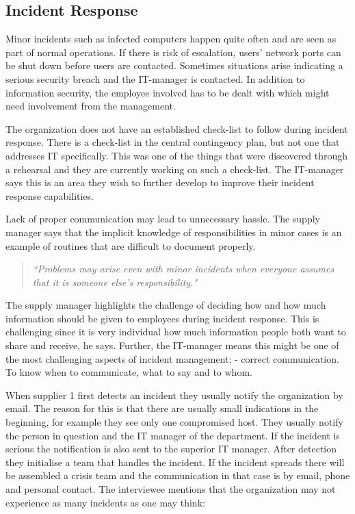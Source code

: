 \subsection{Incident Response}
Minor incidents such as infected computers happen quite often and are seen as part of normal operations. If there is risk of escalation, users' network ports can be shut down before users are contacted. Sometimes situations arise indicating a serious security breach and the IT-manager is contacted. In addition to information security, the employee involved has to be dealt with which might need involvement from the management.

The organization does not have an established check-list to follow during incident response. There is a check-list in the central contingency plan, but not one that addresses IT specifically. This was one of the things that were discovered through a rehearsal and they are currently working on such a check-list. The IT-manager says this is an area they wish to further develop to improve their incident response capabilities. 

Lack of proper communication may lead to unnecessary hassle. The supply manager says that the implicit knowledge of responsibilities in minor cases is an example of routines that are difficult to document properly.
\begin{quote}
\textit{``Problems may arise even with minor incidents when everyone assumes that it is someone else's responsibility."}
\end{quote}

The supply manager highlights the challenge of deciding how and how much information should be given to employees during incident response. This is challenging since it is very individual how much information people both want to share and receive, he says. Further, the IT-manager means this might be one of the most challenging aspects of incident management; - correct communication. To know when to communicate, what to say and to whom. 

When supplier 1 first detects an incident they usually notify the organization by email. The reason for this is that there are usually small indications in the beginning, for example they see only one compromised host. They usually notify the person in question and the IT manager of the department. If the incident is serious the notification is also sent to the superior IT manager. After detection they initialise a team that handles the incident. If the incident spreads there will be assembled a crisis team and the communication in that case is by email, phone and personal contact. The interviewee mentions that the organization may not experience as many incidents as one may think:

